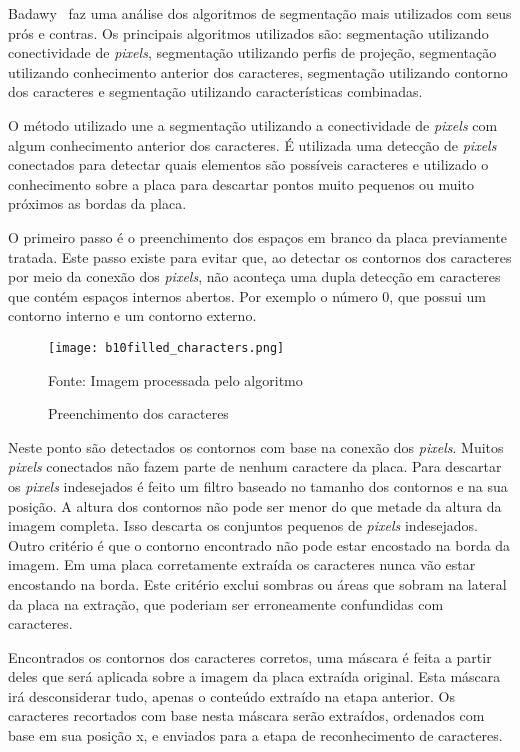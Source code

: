 Badawy~\cite{s2013automatic} faz uma análise dos algoritmos de segmentação mais
utilizados com seus prós e contras.  Os principais algoritmos utilizados são:
segmentação utilizando conectividade de \emph{pixels}, segmentação utilizando
perfis de projeção, segmentação utilizando conhecimento anterior dos caracteres,
segmentação utilizando contorno dos caracteres e segmentação utilizando
características combinadas.

O método utilizado une a segmentação utilizando a conectividade de \emph{pixels} com algum conhecimento anterior dos caracteres. É utilizada uma detecção de \emph{pixels} conectados para detectar quais elementos são possíveis caracteres e utilizado o conhecimento sobre a placa para descartar pontos muito pequenos ou muito próximos as bordas da placa.

O primeiro passo é o preenchimento dos espaços em branco da placa previamente tratada. Este passo existe para evitar que, ao detectar os contornos dos caracteres por meio da conexão dos \emph{pixels}, não aconteça uma dupla detecção em caracteres que contém espaços internos abertos. Por exemplo o número 0, que possui um contorno interno e um contorno externo.

\begin{figure}[H]
	\centering
	\texttt{[image: b10filled\_characters.png]}
	\caption{Preenchimento dos caracteres}
Fonte: Imagem processada pelo algoritmo
	\label{fig:preenchimento}
\end{figure}

Neste ponto são detectados os contornos com base na conexão dos \emph{pixels}. Muitos \emph{pixels} conectados não fazem parte de nenhum caractere da placa. Para descartar os \emph{pixels} indesejados é feito um filtro baseado no tamanho dos contornos e na sua posição. A altura dos contornos não pode ser menor do que metade da altura da imagem completa. Isso descarta os conjuntos pequenos de \emph{pixels} indesejados. Outro critério é que o contorno encontrado não pode estar encostado na borda da imagem. Em uma placa corretamente extraída os caracteres nunca vão estar encostando na borda. Este critério exclui sombras ou áreas que sobram na lateral da placa na extração, que poderiam ser erroneamente confundidas com caracteres.

Encontrados os contornos dos caracteres corretos, uma máscara é feita a partir deles que será aplicada sobre a imagem da placa extraída original. Esta máscara irá desconsiderar tudo, apenas o conteúdo extraído na etapa anterior. Os caracteres recortados com base nesta máscara serão extraídos, ordenados com base em sua posição x, e enviados para a etapa de reconhecimento de caracteres.

